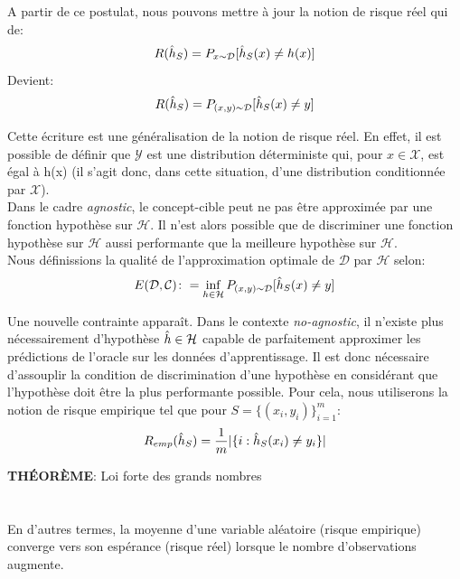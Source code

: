 \noindent A partir de ce postulat, nous pouvons mettre à jour la notion de risque réel qui de:
$$R(\Hat{h}_S)=P_{x\sim\mathcal{D}}[\Hat{h}_S(x)\neq h(x)]$$
\noindent Devient:
$$R(\Hat{h}_S)=P_{(x,y)\sim\mathcal{D}}[\Hat{h}_S(x)\neq y]$$

\noindent Cette écriture est une généralisation de la notion de risque réel. En effet, il est possible de définir que $\mathcal{Y}$ est une distribution déterministe qui, pour $x \in \mathcal{X}$, est égal à h(x) (il s'agit donc, dans cette situation, d'une distribution conditionnée par $\mathcal{X}$).\\

\noindent Dans le cadre \textit{agnostic}, le concept-cible peut ne pas être approximée par une fonction hypothèse sur $\mathcal{H}$. Il n'est alors possible que de discriminer une fonction hypothèse sur $\mathcal{H}$ aussi performante que la meilleure hypothèse sur $\mathcal{H}$.\\

\noindent Nous définissions la qualité de l'approximation optimale de $\mathcal{D}$ par $\mathcal{H}$ selon:
$$E(\mathcal{D},\mathcal{C})\colon=\inf_{h\in\mathcal{H}}P_{(x,y)\sim\mathcal{D}}[\Hat{h}_S(x)\neq y]$$

\noindent Une nouvelle contrainte apparaît. Dans le contexte \textit{no-agnostic}, il n'existe plus nécessairement d'hypothèse $\Hat{h} \in \mathcal{H}$ capable de parfaitement approximer les prédictions de l'oracle sur les données d'apprentissage. Il est donc nécessaire d'assouplir la condition de discrimination d'une hypothèse en considérant que l'hypothèse doit être la plus performante possible. Pour cela, nous utiliserons la notion de risque empirique tel que pour $S=\{(x_i,y_i)\}_{i=1}^m$:
$$R_{emp}(\Hat{h}_S)=\frac{1}{m}|\{i:\hat{h}_S(x_i) \neq y_i\}|$$

\noindent \textbf{THÉORÈME}: Loi forte des grands nombres\\

\\
\\

\noindent En d'autres termes, la moyenne d'une variable aléatoire (risque empirique) converge vers son espérance (risque réel) lorsque le nombre d'observations augmente.\\

